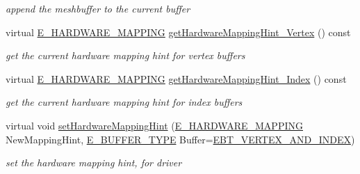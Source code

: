 \begin{DoxyCompactItemize}
\begin{DoxyCompactList}\small\item\em append the meshbuffer to the current buffer \end{DoxyCompactList}\item 
\mbox{\label{structirr_1_1scene_1_1SSkinMeshBuffer_a1f969cf6a394f4dce500ba446e150c88}} 
virtual \hyperlink{namespaceirr_1_1scene_ac7d8ee8d77da75f2580bb9bb17231c27}{E\+\_\+\+H\+A\+R\+D\+W\+A\+R\+E\+\_\+\+M\+A\+P\+P\+I\+NG} \hyperlink{structirr_1_1scene_1_1SSkinMeshBuffer_a1f969cf6a394f4dce500ba446e150c88}{get\+Hardware\+Mapping\+Hint\+\_\+\+Vertex} () const
\begin{DoxyCompactList}\small\item\em get the current hardware mapping hint for vertex buffers \end{DoxyCompactList}\item 
\mbox{\label{structirr_1_1scene_1_1SSkinMeshBuffer_a3f1c1c7652af10b2de87ae24ff2989ff}} 
virtual \hyperlink{namespaceirr_1_1scene_ac7d8ee8d77da75f2580bb9bb17231c27}{E\+\_\+\+H\+A\+R\+D\+W\+A\+R\+E\+\_\+\+M\+A\+P\+P\+I\+NG} \hyperlink{structirr_1_1scene_1_1SSkinMeshBuffer_a3f1c1c7652af10b2de87ae24ff2989ff}{get\+Hardware\+Mapping\+Hint\+\_\+\+Index} () const
\begin{DoxyCompactList}\small\item\em get the current hardware mapping hint for index buffers \end{DoxyCompactList}\item 
\mbox{\label{structirr_1_1scene_1_1SSkinMeshBuffer_abee3db2badc118f0024a75eb86bc823b}} 
virtual void \hyperlink{structirr_1_1scene_1_1SSkinMeshBuffer_abee3db2badc118f0024a75eb86bc823b}{set\+Hardware\+Mapping\+Hint} (\hyperlink{namespaceirr_1_1scene_ac7d8ee8d77da75f2580bb9bb17231c27}{E\+\_\+\+H\+A\+R\+D\+W\+A\+R\+E\+\_\+\+M\+A\+P\+P\+I\+NG} New\+Mapping\+Hint, \hyperlink{namespaceirr_1_1scene_a8f59a89ffef0ad8e5b2c2cb874a93e8c}{E\+\_\+\+B\+U\+F\+F\+E\+R\+\_\+\+T\+Y\+PE} Buffer=\hyperlink{namespaceirr_1_1scene_a8f59a89ffef0ad8e5b2c2cb874a93e8ca34ea664123fbc28610408e51b014dcdd}{E\+B\+T\+\_\+\+V\+E\+R\+T\+E\+X\+\_\+\+A\+N\+D\+\_\+\+I\+N\+D\+EX})
\begin{DoxyCompactList}\small\item\em set the hardware mapping hint, for driver \end{DoxyCompactList}\item 

\end{DoxyCompactItemize}
